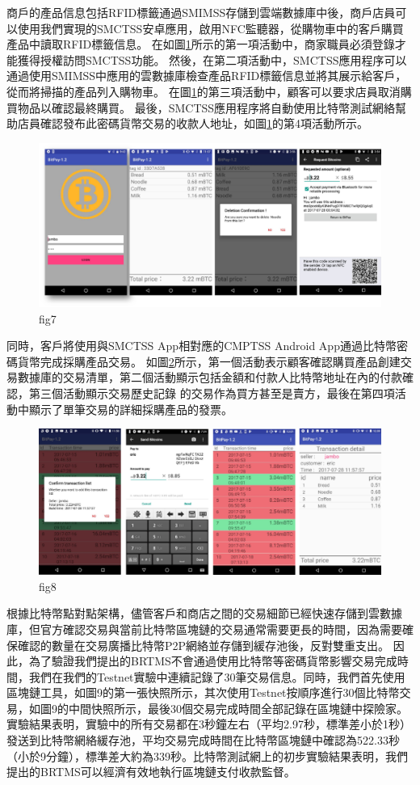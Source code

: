 商戶的產品信息包括RFID標籤通過SMIMSS存儲到雲端數據庫中後，商戶店員可以使用我們實現的SMCTSS安卓應用，啟用NFC監聽器，從購物車中的客戶購買產品中讀取RFID標籤信息。 在如圖\ref{fig7}所示的第一項活動中，商家職員必須登錄才能獲得授權訪問SMCTSS功能。 然後，在第二項活動中，SMCTSS應用程序可以通過使用SMIMSS中應用的雲數據庫檢查產品RFID標籤信息並將其展示給客戶，從而將掃描的產品列入購物車。 在圖\ref{fig7}的第三項活動中，顧客可以要求店員取消購買物品以確認最終購買。 最後，SMCTSS應用程序將自動使用比特幣測試網絡幫助店員確認發布此密碼貨幣交易的收款人地址，如圖\ref{fig7}的第4項活動所示。    
\begin{figure}[h]
	\centering
	\includegraphics[width = 1\textwidth]{fig7.png}
	\caption{fig7}\label{fig7}
\end{figure}
同時，客戶將使用與SMCTSS App相對應的CMPTSS Android App通過比特幣密碼貨幣完成採購產品交易。 如圖\ref{fig8}所示，第一個活動表示顧客確認購買產品創建交易數據庫的交易清單，第二個活動顯示包括金額和付款人比特幣地址在內的付款確認，第三個活動顯示交易歷史記錄 的交易作為買方甚至是賣方，最後在第四項活動中顯示了單筆交易的詳細採購產品的發票。    
\begin{figure}[h]
	\centering
	\includegraphics[width = 1\textwidth]{fig8.png}
	\caption{fig8}\label{fig8}
\end{figure}

根據比特幣點對點架構，儘管客戶和商店之間的交易細節已經快速存儲到雲數據庫，但官方確認交易與當前比特幣區塊鏈的交易通常需要更長的時間，因為需要確保確認的數量在交易廣播比特幣P2P網絡並存儲到緩存池後，反對雙重支出。
因此，為了驗證我們提出的BRTMS不會通過使用比特幣等密碼貨幣影響交易完成時間，我們在我們的Testnet實驗中連續記錄了30筆交易信息。同時，我們首先使用區塊鏈工具，如圖9的第一張快照所示，其次使用Testnet按順序進行30個比特幣交易，如圖9的中間快照所示，最後30個交易完成時間全部記錄在區塊鏈中探險家。實驗結果表明，實驗中的所有交易都在3秒鐘左右（平均2.97秒，標準差小於1秒）發送到比特幣網絡緩存池，平均交易完成時間在比特幣區塊鏈中確認為522.33秒（小於9分鐘），標準差大約為339秒。比特幣測試網上的初步實驗結果表明，我們提出的BRTMS可以經濟有效地執行區塊鏈支付收款監督。    
